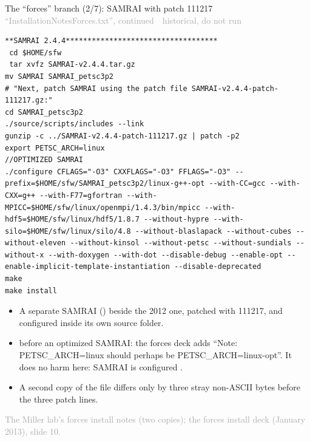 \documentclass[aspectratio=169,11pt]{beamer}
\newcommand{\sourcecredit}[1]{\vfill\begin{flushright}\tiny\textcolor{DarkGray}{#1}\end{flushright}}
\newcommand{\hist}[1]{{\tiny\sffamily\textcolor{DarkGray}{#1\ \textbullet\ historical, do not run}}\par\nointerlineskip\vspace{0.3mm}}
\begin{document}
\begin{frame}[fragile]{The ``forces'' branch (2/7): SAMRAI with patch 111217}
\label{fr:forces2}
\hist{``InstallationNotesForces.txt'', continued}
\begin{lstlisting}[style=hist]
**SAMRAI 2.4.4***********************************
 cd $HOME/sfw
 tar xvfz SAMRAI-v2.4.4.tar.gz
mv SAMRAI SAMRAI_petsc3p2
# "Next, patch SAMRAI using the patch file SAMRAI-v2.4.4-patch-111217.gz:"
cd SAMRAI_petsc3p2
./source/scripts/includes --link
gunzip -c ../SAMRAI-v2.4.4-patch-111217.gz | patch -p2
export PETSC_ARCH=linux
//OPTIMIZED SAMRAI
./configure CFLAGS="-O3" CXXFLAGS="-O3" FFLAGS="-O3" --prefix=$HOME/sfw/SAMRAI_petsc3p2/linux-g++-opt --with-CC=gcc --with-CXX=g++ --with-F77=gfortran --with-MPICC=$HOME/sfw/linux/openmpi/1.4.3/bin/mpicc --with-hdf5=$HOME/sfw/linux/hdf5/1.8.7 --without-hypre --with-silo=$HOME/sfw/linux/silo/4.8 --without-blaslapack --without-cubes --without-eleven --without-kinsol --without-petsc --without-sundials --without-x --with-doxygen --with-dot --disable-debug --enable-opt --enable-implicit-template-instantiation --disable-deprecated
make
make install
\end{lstlisting}
\scriptsize
\begin{itemize}\setlength{\itemsep}{2pt}
  \item A separate SAMRAI () beside the 2012 one, patched with 111217, and configured inside its own source folder.
  \item {} before an optimized SAMRAI: the forces deck adds ``Note: PETSC\_ARCH=linux should perhaps be PETSC\_ARCH=linux-opt''. It does no harm here: SAMRAI is configured .
  \item A second copy of the file differs only by three stray non-ASCII bytes before the three patch lines.
\end{itemize}
\sourcecredit{The Miller lab's forces install notes (two copies); the forces install deck (January 2013), slide 10.}
\end{frame}
\end{document}
